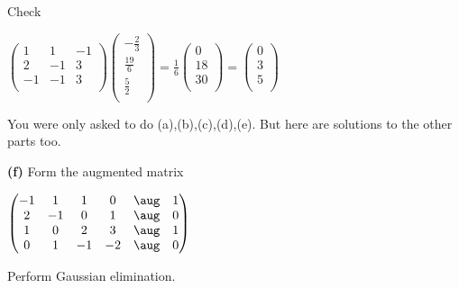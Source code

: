 \documentclass[oneside,12pt]{amsart}
\begin{document}
\bigskip

Check

\bigskip

$
\begin{pmatrix}
 1  &  1 &  -1  \\
 2  & -1 &   3  \\
-1  & -1 &   3  \\
\end{pmatrix}
\begin{pmatrix}
-\frac{2}{3} \\[6pt]
\frac{19}{6}\\[6pt]
\frac{5}{2}\\[6pt]
\end{pmatrix}
=
\frac{1}{6}
\begin{pmatrix}
0\\[6pt]
18\\[6pt]
30\\[6pt]
\end{pmatrix}
=
\begin{pmatrix}
0 \\[6pt]
3\\[6pt]
5 \\[6pt]
\end{pmatrix}
$

\bigskip


You were only asked to do (a),(b),(c),(d),(e). But here are
solutions to the other parts too.

\medskip

\textbf{(f)} Form the augmented matrix

$
\begin{pmatrix}
 -1  &  1 &  1 &  0 & \aug &  1  \\
  2  & -1 &  0 &  1 & \aug &  0  \\
  1  &  0 &  2 &  3 & \aug &  1  \\
  0  &  1 & -1 & -2 & \aug &  0  \\
\end{pmatrix}
$

Perform Gaussian elimination.

\bigskip
\end{document}
